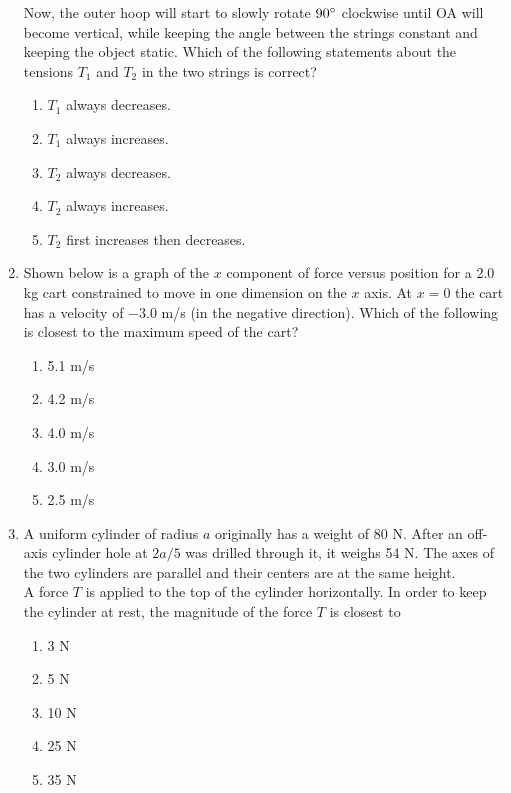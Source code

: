 \documentclass[12pt,letterpaper]{article}
\begin{document}
\begin{enumerate}[resume]
Now, the outer hoop will start to slowly rotate $90\degree$ clockwise until OA will become vertical, while keeping the angle between the strings constant and keeping the object static. Which of the following statements about the tensions $T_1$ and $T_2$ in the two strings is correct?
\begin{enumerate}
\item $T_1$ always decreases.
\item $T_1$ always increases.
\item $T_2$ always decreases.
\item $T_2$ always increases.
\item $T_2$ first increases then decreases.
\end{enumerate}

\item
Shown below is a graph of the $x$ component of force versus position for a 2.0 kg cart constrained to move in one dimension on the $x$ axis. At $x=0$ the cart has a velocity of $-3.0$ m/s (in the negative direction). Which of the following is closest to the maximum speed of the cart?
\begin{enumerate}
\item 5.1 m/s
\item 4.2 m/s
\item 4.0 m/s
\item 3.0 m/s
\item 2.5 m/s
\end{enumerate}

\item
A uniform cylinder of radius $a$ originally has a weight of 80 N. After an off-axis cylinder hole at $2a/5$ was drilled through it, it weighs 54 N. The axes of the two cylinders are parallel and their centers are at the same height.\\

A force $T$ is applied to the top of the cylinder horizontally. In order to keep the cylinder at rest, the magnitude of the force $T$ is closest to
\begin{enumerate}
\item 3 N
\item 5 N
\item 10 N
\item 25 N
\item 35 N
\end{enumerate}


\end{enumerate}
\end{document}
